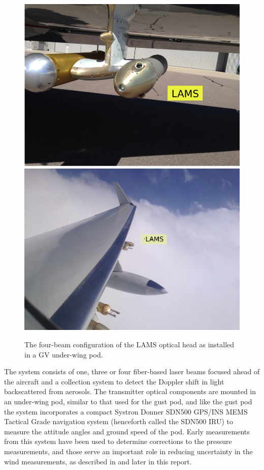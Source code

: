 \documentclass[12pt,twoside,english]{article}\usepackage[]{graphicx}\usepackage[]{color}
\let\OrgIndex\index
\renewcommand*{\index}[1]{\OrgIndex{#1}}
\begin{document}
\begin{figure}%
\noindent \begin{centering}%
\includegraphics[width=0.59\columnwidth]{LAMS-1r}%
\includegraphics[width=0.4\columnwidth]{LAMS-2r}%
\caption{The four-beam configuration of the LAMS optical head as installed in a GV under-wing pod.}%
\label{fig:LAMS-4Beam}%
\end{centering}%
\end{figure}%
The system consists of one, three or four fiber-based laser beams focused ahead of the aircraft and a collection system to detect the Doppler shift in light backscattered from aerosols. The transmitter optical components are mounted in an under-wing pod, similar to that used for the gust pod, and like the gust pod the system incorporates a compact Systron Donner SDN500 GPS/INS MEMS Tactical Grade navigation system (henceforth called the SDN500 IRU) to measure the attitude angles and ground speed of the pod. Early measurements from this system have been used to determine corrections to the pressure measurements, and those serve an important role in reducing uncertainty in the wind measurements, as described in \citet{CooperEtAl2014} and later in this report. 
\end{document}
